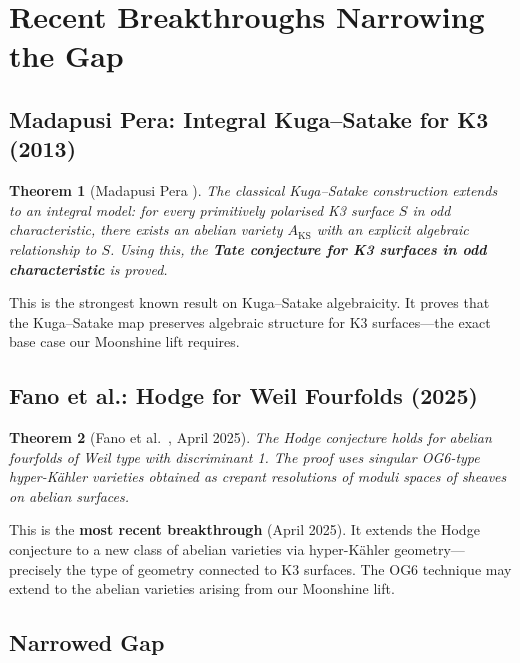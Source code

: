 \documentclass[12pt,a4paper]{article}
\newtheorem{theorem}{Theorem}[section]
\begin{document}
\section{Recent Breakthroughs Narrowing the Gap}

\subsection{Madapusi Pera: Integral Kuga--Satake for K3 (2013)}

\begin{theorem}[Madapusi Pera \cite{MP2013}]
The classical Kuga--Satake construction extends to an integral model: for every primitively polarised K3 surface $S$ in odd characteristic, there exists an abelian variety $A_{\text{KS}}$ with an explicit algebraic relationship to $S$. Using this, the \textbf{Tate conjecture for K3 surfaces in odd characteristic} is proved.
\end{theorem}

This is the strongest known result on Kuga--Satake algebraicity. It proves that the Kuga--Satake map preserves algebraic structure for K3 surfaces---the exact base case our Moonshine lift requires.

\subsection{Fano et al.: Hodge for Weil Fourfolds (2025)}

\begin{theorem}[Fano et al.\ \cite{Fano2025}, April 2025]
The Hodge conjecture holds for abelian fourfolds of Weil type with discriminant 1. The proof uses singular OG6-type hyper-K\"ahler varieties obtained as crepant resolutions of moduli spaces of sheaves on abelian surfaces.
\end{theorem}

This is the \textbf{most recent breakthrough} (April 2025). It extends the Hodge conjecture to a new class of abelian varieties via hyper-K\"ahler geometry---precisely the type of geometry connected to K3 surfaces. The OG6 technique may extend to the abelian varieties arising from our Moonshine lift.

\subsection{Narrowed Gap}
\end{document}
